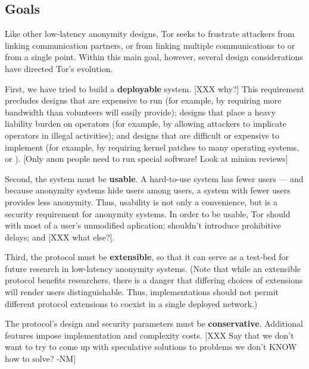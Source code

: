 \documentclass[times,10pt,twocolumn]{article}
\begin{document}
\label{sec:assumptions}


\subsection{Goals}
Like other low-latency anonymity designs, Tor seeks to frustrate
attackers from linking communication partners, or from linking
multiple communications to or from a single point.  Within this
main goal, however, several design considerations have directed
Tor's evolution.

First, we have tried to build a {\bf deployable} system.  [XXX why?]
This requirement precludes designs that are expensive to run (for
example, by requiring more bandwidth than volunteers will easily
provide); designs that place a heavy liability burden on operators
(for example, by allowing attackers to implicate operators in illegal
activities); and designs that are difficult or expensive to implement
(for example, by requiring kernel patches to many operating systems,
or ).  [Only anon people need to run special software!  Look at minion
reviews]  

Second, the system must be {\bf usable}.  A hard-to-use system has
fewer users --- and because anonymity systems hide users among users, a
system with fewer users provides less anonymity.  Thus, usability is
not only a convenience, but is a security requirement for anonymity
systems.  In order to be usable, Tor should with most of a
user's unmodified aplication; shouldn't introduce prohibitive delays; and 
[XXX what else?].

Third, the protocol must be {\bf extensible}, so that it can serve as
a test-bed for future research in low-latency anonymity systems.
(Note that while an extensible protocol benefits researchers, there is
a danger that differing choices of extensions will render users
distinguishable.  Thus, implementations should not permit different
protocol extensions to coexist in a single deployed network.)


The protocol's design and security parameters must be {\bf
conservative}.  Additional features impose implementation and
complexity costs. [XXX Say that we don't want to try to come up with
speculative solutions to problems we don't KNOW how to solve? -NM]
\end{document}
